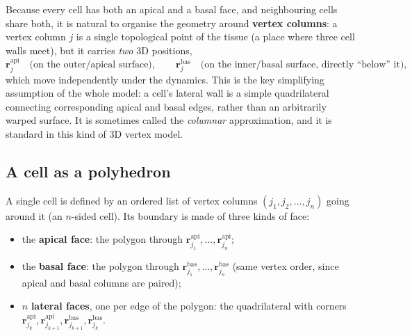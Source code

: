\documentclass[11pt,a4paper]{report}
\newcommand{\rvec}{\mathbf{r}}
\begin{document}
Because every cell has both an apical and a basal face, and neighbouring
cells share both, it is natural to organise the geometry around
\textbf{vertex columns}: a vertex column $j$ is a single topological
point of the tissue (a place where three cell walls meet), but it
carries \emph{two} 3D positions,
\[
  \rvec^{\mathrm{api}}_j \quad\text{(on the outer/apical surface)}, \qquad
  \rvec^{\mathrm{bas}}_j \quad\text{(on the inner/basal surface, directly ``below'' it),}
\]
which move independently under the dynamics. This is the key
simplifying assumption of the whole model: a cell's lateral wall is a
simple quadrilateral connecting corresponding apical and basal edges,
rather than an arbitrarily warped surface. It is sometimes called the
\emph{columnar} approximation, and it is standard in this kind of 3D
vertex model.

\subsection{A cell as a polyhedron}

A single cell is defined by an ordered list of vertex columns
$(j_1, j_2, \ldots, j_n)$ going around it (an $n$-sided cell). Its
boundary is made of three kinds of face:
\begin{itemize}
  \item the \textbf{apical face}: the polygon through
  $\rvec^{\mathrm{api}}_{j_1}, \ldots, \rvec^{\mathrm{api}}_{j_n}$;
  \item the \textbf{basal face}: the polygon through
  $\rvec^{\mathrm{bas}}_{j_1}, \ldots, \rvec^{\mathrm{bas}}_{j_n}$ (same
  vertex order, since apical and basal columns are paired);
  \item $n$ \textbf{lateral faces}, one per edge of the polygon: the
  quadrilateral with corners
  $\rvec^{\mathrm{api}}_{j_k}, \rvec^{\mathrm{api}}_{j_{k+1}}, \rvec^{\mathrm{bas}}_{j_{k+1}}, \rvec^{\mathrm{bas}}_{j_k}$.
\end{itemize}
\end{document}
